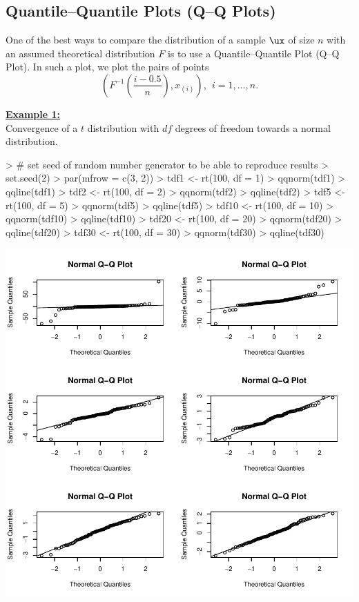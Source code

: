 \newpage


\subsection{Quantile--Quantile Plots (Q--Q Plots)}


One of the best ways to compare the distribution of a sample $\ux$ of size $n$
with an assumed theoretical distribution $F$ is to use a 
Quantile--Quantile Plot (Q--Q Plot). In such a plot, we plot
the pairs of points
\[
\left( F^{-1} \left( \frac{i - 0.5}{n} \right), x_{(i)} \right), 
~~ i = 1, \ldots, n.
\]


\noindent
\underline{\bf Example 1:} \\
Convergence of a $t$ distribution with $df$ degrees of freedom
towards a normal distribution.

\begin{Schunk}
\begin{Sinput}
> # set seed of random number generator to be able to reproduce results
> set.seed(2) 
> par(mfrow = c(3, 2))
> tdf1 <- rt(100, df = 1)
> qqnorm(tdf1)
> qqline(tdf1)
> tdf2 <- rt(100, df = 2)
> qqnorm(tdf2)
> qqline(tdf2)
> tdf5 <- rt(100, df = 5)
> qqnorm(tdf5)
> qqline(tdf5)
> tdf10 <- rt(100, df = 10)
> qqnorm(tdf10)
> qqline(tdf10)
> tdf20 <- rt(100, df = 20)
> qqnorm(tdf20)
> qqline(tdf20)
> tdf30 <- rt(100, df = 30)
> qqnorm(tdf30)
> qqline(tdf30)
\end{Sinput}
\end{Schunk}
\includegraphics{lect_chapter5_v2-031}


